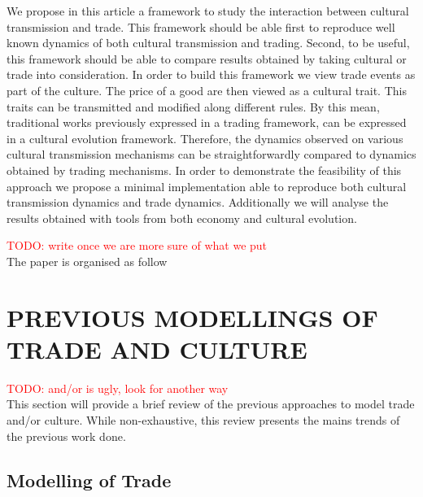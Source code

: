 \documentclass{wscpaperproc}
\newcommand{\memo}[2]{\textcolor{#1}{#2}}
\newcommand{\todo}[1]{\memo{red}{TODO: #1\\}}
\begin{document}
We propose in this article a framework to study the interaction between cultural transmission and trade. This framework should be able first to reproduce well known dynamics of both cultural transmission and trading. Second, to be useful, this framework should be able to compare results obtained by taking cultural or trade into consideration. In order to build this framework we view trade events as part of the culture. The price of a good are then viewed as a cultural trait. This traits can be transmitted and modified along different rules. By this mean, traditional works previously expressed in a trading framework, can be expressed in a cultural evolution framework. Therefore, the dynamics observed on various cultural transmission mechanisms can be straightforwardly compared to dynamics obtained by trading mechanisms. In order to demonstrate the feasibility of this approach we propose a minimal implementation able to reproduce both cultural transmission dynamics and trade dynamics. Additionally we will analyse the results obtained with tools from both economy and cultural evolution.




\todo{write once we are more sure of what we put}
The paper is organised as follow

\section{PREVIOUS MODELLINGS OF TRADE AND CULTURE}

\todo{and/or is ugly, look for another way}
This section will provide a brief review of the previous approaches to model trade and/or culture. While non-exhaustive, this review presents the mains trends of the previous work done.

\subsection{Modelling of Trade}

\end{document}
